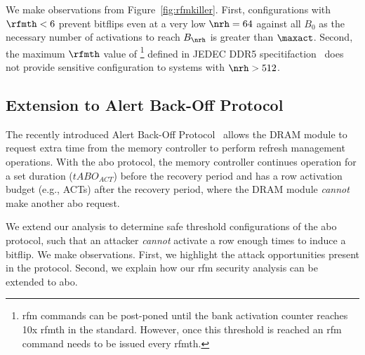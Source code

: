 {%

We make  observations from Figure~\ref{fig:rfmkiller}.
First, configurations with $\rfmth < 6$ prevent bitflips even at a very low $\nrh=64$ against all $B_{0}$ as the necessary number of activations to reach $B_{\nrh}$ is greater than $\maxact$.
Second, the maximum $\rfmth$ value of \footnote{
\gls{rfm} commands can be post-poned until the bank activation counter reaches 10x \gls{rfmth} in the standard. However, once this threshold is reached an \gls{rfm} command needs to be issued every \gls{rfmth}.}
defined in JEDEC DDR5 specitifaction~\cite{jedecddr5} does not provide sensitive configuration to systems with $\nrh > 512$.

\subsection{Extension to Alert Back-Off Protocol}
\label{sec:aboanalysis}

The recently introduced Alert Back-Off Protocol~\cite{jedecddr5} allows the DRAM module to request extra time from the memory controller to perform refresh management operations. With the \gls{abo} protocol, the memory controller continues operation for a set duration ($tABO_{ACT}$) before the recovery period and has a row activation budget (e.g.,  ACTs) after the recovery period, where the DRAM module \emph{cannot} make another \gls{abo} request.

We extend our analysis to determine safe threshold configurations of the \gls{abo} protocol, such that an attacker \emph{cannot} activate a row enough times to induce a bitflip. We make  observations. First, we highlight the attack opportunities present in the protocol. Second, we explain how our \gls{rfm} security analysis can be extended to \gls{abo}.


}
